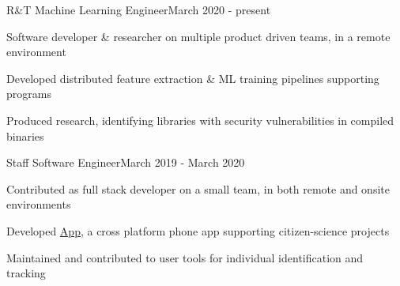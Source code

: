 \documentclass{article}
\newenvironment{**mylist}[2]{
  \subsubsection*{#1\hfill#2}
  \small
  \begin{list}{}{}
    \setlength{\topsep}{0pt}
   \setlength{\itemsep}{1pt}
   \setlength{\parskip}{0pt}
   \setlength{\parsep}{0pt}}{\end{list}\normalsize}
\newcommand{\LU}[1]{\hspace{-1em}{\bf Technologies : #1}}
\begin{document}
\begin{**mylist}{\href{https://www.grammatech.com}{} \tabb R\&T Machine Learning Engineer}{March 2020 - present}
\item Software developer \& researcher on multiple product driven teams, in a remote environment
\item Developed distributed feature extraction \& ML training pipelines supporting  programs
\item Produced research, identifying libraries with security vulnerabilities in compiled binaries
\item \LU{Python, Docker, celery, Kibana, GitLab.ci, TargetProcess, MongoDB, LevelDB}
\end{**mylist}

\begin{**mylist}{\href{www.happywhale.com}{} \tabb Staff Software Engineer}{March 2019 - March 2020}
\item Contributed as full stack developer on a small team, in both remote and onsite environments
\item Developed \href{https://play.google.com/store/apps/details?id=com.animalus.scidir&hl=en_US}{ App}, a cross platform phone app supporting citizen-science projects
\item Maintained and contributed to user tools for individual  identification and tracking
\item \LU{Native/TypeScript, Angular, Android, iOS, PostgreSQL, Java, Spring, firebase}
\end{**mylist}
\end{document}
